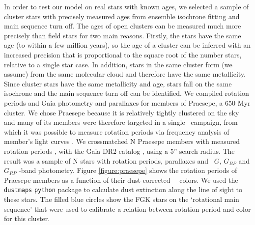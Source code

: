 In order to test our model on real stars with known ages, we selected a sample
of cluster stars with precisely measured ages from ensemble isochrone fitting
and main sequence turn off.
The ages of open clusters can be measured much more precisely than field
stars for two main reasons.
Firstly, the stars have the same age (to within a few million years), so the
age of a cluster can be inferred with an increased precision that is
proportional to the square root of the number stars, relative to a single star
case.
In addition, stars in the same cluster form (we assume) from the same
molecular cloud and therefore have the same metallicity.
Since cluster stars have the same metallicity and age, stars fall on the same
isochrone and the main sequence turn
off can be identified.
We compiled rotation periods and Gaia photometry and parallaxes for members of
Praesepe, a 650 Myr cluster.
We chose Praesepe because it is relatively tightly clustered on the sky and
many of its members were therefore targeted in a single \ktwo\ campaign, from
which it was possible to measure rotation periods via frequency analysis of
member's light curves \citep{douglas2015}.
We crossmatched N Praesepe members with measured rotation periods
\citep{douglas2015}, with the Gaia DR2 catalog ,
using a 5'' search radius.
The result was a sample of N stars with rotation periods, parallaxes and
\gaia\ $G$, $G_{BP}$ and $G_{RP}$ -band photometry.
Figure \ref{figure:praesepe} shows the rotation periods of Praesepe members as
a function of their dust-corrected \gaia\ \gcolor\ colors.
We used the {\tt dustmaps} {\tt python} package to calculate dust extinction
along the line of sight to these stars.
The filled blue circles show the FGK stars on the `rotational main sequence'
that were used to calibrate a relation between rotation period and color for
this cluster.

